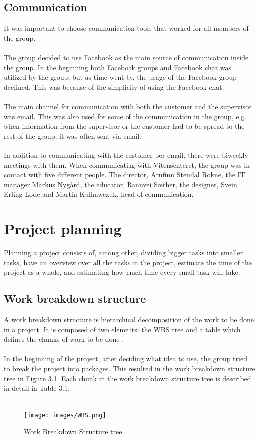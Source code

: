 \subsection{Communication}
It was important to choose communication tools that worked for all members of the group. \\
\\
The group decided to use Facebook as the main source of communication inside the group. In the beginning both Facebook groups and Facebook chat was utilized by the group, but as time went by, the usage of the Facebook group declined. This was because of the simplicity of using the Facebook chat.\\
\\
The main channel for communication with both the customer and the supervisor was email. This was also used for some of the communication in the group, e.g. when information from the supervisor or the customer had to be spread to the rest of the group, it was often sent via email.\\
\\
In addition to communicating with the customer per email, there were biweekly meetings with them. When communicating with Vitensenteret, the group was in contact with five different people. The director, Arnfinn Stendal Rokne, the IT manager Markus Nygård, the educator, Rannvei Sæther, the designer, Svein Erling Lode and Martin Kulhawczuk, head of communication.


\section{Project planning}
Planning a project consists of, among other, dividing bigger tasks into smaller tasks, have an overview over all the tasks in the project, estimate the time of the project as a whole, and estimating how much time every small task will take.

\subsection{Work breakdown structure}
A work breakdown structure is hierarchical decomposition of the work to be done in a project. It is composed of two elements: the WBS tree and a table which defines the chunks of work to be done \cite{wbs}\cite{wbs2}.\\
\\
In the beginning of the project, after deciding what idea to use, the group tried to break the project into packages. This resulted in the work breakdown structure tree in Figure 3.1. Each chunk in the work breakdown structure tree is described in detail in Table 3.1.\\
\\
\begin{figure}[H]
    \texttt{[image: images/WBS.png]}
    \caption{Work Breakdown Structure tree}
\end{figure}


